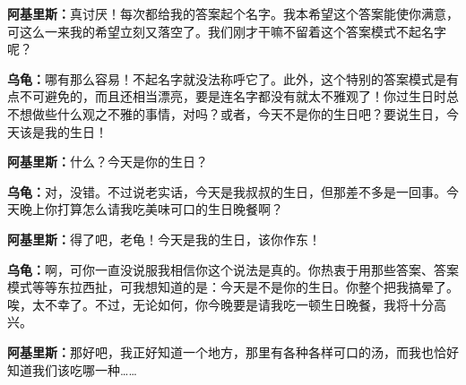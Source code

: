 \documentclass[
  12pt,
  twoside,
  openright,
  oldfontcommands,
]{memoir}
\newcommand{\dialogname}[1]{{\heifamily\bfseries #1}}
\begin{document}
\dialogname{阿基里斯：}真讨厌！每次都给我的答案起个名字。我本希望这个答案能使你满意，可这么一来我的希望立刻又落空了。我们刚才干嘛不留着这个答案模式不起名字呢？

\dialogname{乌龟：}哪有那么容易！不起名字就没法称呼它了。此外，这个特别的答案模式是有点不可避免的，而且还相当漂亮，要是连名字都没有就太不雅观了！你过生日时总不想做些什么观之不雅的事情，对吗？或者，今天不是你的生日吧？要说生日，今天该是我的生日！

\dialogname{阿基里斯：}什么？今天是你的生日？

\dialogname{乌龟：}对，没错。不过说老实话，今天是我叔叔的生日，但那差不多是一回事。今天晚上你打算怎么请我吃美味可口的生日晚餐啊？

\dialogname{阿基里斯：}得了吧，老龟！今天是我的生日，该你作东！

\dialogname{乌龟：}啊，可你一直没说服我相信你这个说法是真的。你热衷于用那些答案、答案模式等等东拉西扯，可我想知道的是：今天是不是你的生日。你整个把我搞晕了。唉，太不幸了。不过，无论如何，你今晚要是请我吃一顿生日晚餐，我将十分高兴。

\dialogname{阿基里斯：}那好吧，我正好知道一个地方，那里有各种各样可口的汤，而我也恰好知道我们该吃哪一种\ldots\ldots{}

\label{Chapter15.xhtml}{}
\end{document}
